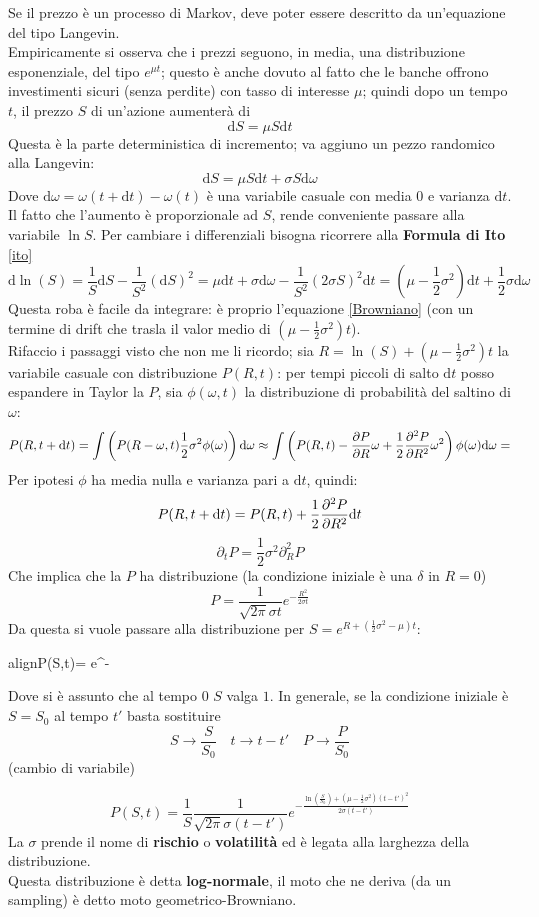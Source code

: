 \documentclass[a4paper,12pt]{article}
\newcommand{\boxedeq}[2]{\begin{empheq}[box={\fboxsep=6pt\fbox}]{align}\label{#1}#2\end{empheq}}
\theoremstyle{plain}
\theoremstyle{definition}
\newcommand{\f}[2]{\frac{#1}{#2}}
\renewcommand{\d}{\text{d}}
\theoremstyle{remark}
\begin{document}
Se il prezzo è un processo di Markov, deve poter essere descritto da un'equazione del tipo Langevin. \\Empiricamente si osserva che i prezzi seguono, in media, una distribuzione esponenziale, del tipo $e^{\mu t}$; questo è anche dovuto al fatto che le banche offrono investimenti sicuri (senza perdite) con tasso di interesse $\mu$; quindi dopo un tempo $t$, il prezzo $S$ di un'azione aumenterà di \[\d S=\mu S\d t		\]
 Questa è la parte deterministica di incremento; va aggiuno un pezzo randomico alla Langevin:
 \[\d S=\mu S \d t+\sigma S \d \omega		\]
Dove $\d \omega= \omega(t+\d t)-\omega(t)$ è una variabile casuale con media 0 e varianza $\d t$. Il fatto che l'aumento è proporzionale ad $S$, rende conveniente passare alla variabile $\ln S$. Per cambiare i differenziali bisogna ricorrere alla \textbf{Formula di Ito} \ref{ito}
\[\d \ln(S)=\f{1}{S}\d S-\f{1}{S^2}\left(\d S\right)^2=\mu \d t+\sigma \d \omega-\f{1}{S^2}(2\sigma S)	^2 \d t=\left(\mu-\f{1}{2}\sigma^2\right)\d t+\f{1}{2}\sigma\d \omega\]
Questa roba è facile da integrare: è proprio l'equazione \ref{Browniano} (con un termine di drift che trasla il valor medio di $\left(\mu-\f{1}{2}\sigma^2\right)t$).\\
Rifaccio i passaggi visto che non me li ricordo; sia $R=\ln(S)+\left(\mu-\f{1}{2}\sigma^2\right)t$ la variabile casuale con distribuzione $P(R,t)$: per tempi piccoli di salto $\d t $ posso espandere in Taylor la $P$, sia $\phi(\omega,t) $ la distribuzione di probabilità del saltino di $\omega$:
\[P(R, t+\d t)=\int \left(P(R-\omega,t)  \f{1}{2}\sigma^2\phi(\omega)\right)\d \omega \approx\int\left( P(R,t) -\pdv{P}{R} \omega+\f{1}{2}\pdv[2]{P}{R}\omega^2\right)	\phi(\omega)\d 	\omega=	\]
Per ipotesi $\phi$ ha media nulla e varianza pari a $\d t$, quindi:
\[P(R,t+\d t)=P(R,t)+\f{1}{2}\pdv[2]{P}{R}\d t		\]
\[\partial_t P=\f{1}{2}\sigma^2\partial^2_R P\]
Che implica che la $P$ ha distribuzione (la condizione iniziale è una $\delta$ in $R=0$)\[P= \f{1}{\sqrt{2\pi}\sigma t} e^{-\f{R^2}{2 \sigma t}}\]
Da questa si vuole passare alla distribuzione per $S=e^{R+\left(\f{1} {2}\sigma^2-\mu\right)t}$:
\boxedeq{Geom}{P(S,t)=\f{1}{S} \f{1}{\sqrt{2\pi}\sigma t} e^{-\f{\ln(S)+\left(\mu-\f{1}{2}\sigma^2\right)t^2}{2 \sigma t}}	}
Dove si è assunto che al tempo $0$ $S$ valga $1$.
In generale, se la condizione iniziale è $S=S_0$ al tempo $t'$ basta sostituire\[S\rightarrow\f{S}{S_0}\quad	t\rightarrow t-t'\quad P\rightarrow \f{ P}{S_0}	\]
(cambio di variabile)

\[P(S,t)=\f{1}{S}\f{1}{\sqrt{2\pi}\sigma (t-t')} e^{-\f{\ln\left(\f{S}{S_0}\right)+\left(\mu-\f{1}{2}\sigma^2\right)(t-t')^2}{2 \sigma (t-t')}	}\]
La $\sigma$ prende il nome di \textbf{rischio} o \textbf{volatilità} ed è legata alla larghezza della distribuzione. \\Questa distribuzione è detta \textbf{ log-normale}, il moto che ne deriva (da un sampling) è detto moto geometrico-Browniano.
\end{document}
